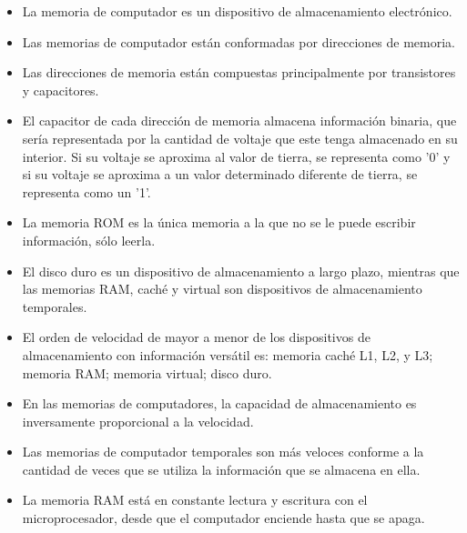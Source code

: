 \documentclass{article}
\begin{document}
    \begin{itemize}
    
        \item
            La memoria de computador es un dispositivo de almacenamiento electrónico.
            
        \item 
            Las memorias de computador están conformadas por direcciones de memoria.
            
        \item 
            Las direcciones de memoria están compuestas principalmente por transistores y capacitores.
            
        \item 
             El capacitor de cada dirección de memoria almacena información binaria, que sería representada por la cantidad de voltaje que este tenga almacenado en su interior. Si su voltaje se aproxima al valor de tierra, se representa como '0' y si su voltaje se aproxima a un valor determinado diferente de tierra, se representa como un '1'.
             
        \item
            La memoria ROM es la única memoria a la que no se le puede escribir información, sólo leerla.
             
        \item
            El disco duro es un dispositivo de almacenamiento a largo plazo, mientras que las memorias RAM, caché y virtual son dispositivos de almacenamiento temporales.      
             
        \item
            El orden de velocidad de mayor a menor de los dispositivos de almacenamiento con información versátil es: memoria caché L1, L2, y L3; memoria RAM; memoria virtual; disco duro.
            
        \item
            En las memorias de computadores, la capacidad de almacenamiento es inversamente proporcional a la velocidad.
        
        \item
            Las memorias de computador temporales son más veloces conforme a la cantidad de veces que se utiliza la información que se almacena en ella.     
            
        \item
            La memoria RAM está en constante lectura y escritura con el microprocesador, desde que el computador enciende hasta que se apaga.
            

\end{itemize}
\end{document}
